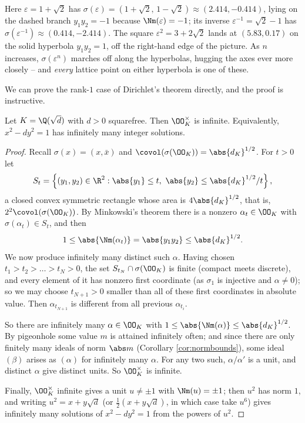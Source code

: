 Here $\varepsilon = 1+\sqrt2$ has $\sigma(\varepsilon) = (1+\sqrt2,\,1-\sqrt2)\approx(2.414,-0.414)$, lying on the dashed branch $y_1y_2 = -1$ because $\Nm(\varepsilon) = -1$; its inverse $\varepsilon^{-1} = \sqrt2-1$ has $\sigma(\varepsilon^{-1}) \approx (0.414,-2.414)$. The square $\varepsilon^2 = 3+2\sqrt2$ lands at $(5.83, 0.17)$ on the solid hyperbola $y_1y_2 = 1$, off the right-hand edge of the picture. As $n$ increases, $\sigma(\varepsilon^n)$ marches off along the hyperbolas, hugging the axes ever more closely -- and \emph{every} lattice point on either hyperbola is one of these.

We can prove the rank-$1$ case of Dirichlet's theorem directly, and the proof is instructive.

\begin{theorem}[Pell]\label{nf-thm:pell}
	Let $K = \Q(\sqrt d)$ with $d > 0$ squarefree. Then $\OO_K^\times$ is infinite. Equivalently, $x^2-dy^2 = 1$ has infinitely many integer solutions.
\end{theorem}

\begin{proof}
	Recall $\sigma(x) = (x,\bar x)$ and $\covol(\sigma(\OO_K)) = \abs{d_K}^{1/2}$. For $t > 0$ let
	$$S_t = \left\{(y_1,y_2) \in \R^2 : \abs{y_1}\le t,\ \abs{y_2}\le \abs{d_K}^{1/2}/t\right\},$$
	a closed convex symmetric rectangle whose area is $4\abs{d_K}^{1/2}$, that is, $2^2\covol(\sigma(\OO_K))$. By Minkowski's theorem there is a nonzero $\alpha_t \in \OO_K$ with $\sigma(\alpha_t)\in S_t$, and then
	$$1 \le \abs{\Nm(\alpha_t)} = \abs{y_1y_2} \le \abs{d_K}^{1/2}.$$
	We now produce infinitely many distinct such $\alpha$. Having chosen $t_1 > t_2 > \dots > t_N > 0$, the set $S_{t_N}\cap\sigma(\OO_K)$ is finite (compact meets discrete), and every element of it has nonzero first coordinate (as $\sigma_1$ is injective and $\alpha \neq 0$); so we may choose $t_{N+1} > 0$ smaller than all of these first coordinates in absolute value. Then $\alpha_{t_{N+1}}$ is different from all previous $\alpha_{t_i}$.

	So there are infinitely many $\alpha \in \OO_K$ with $1 \le \abs{\Nm(\alpha)}\le\abs{d_K}^{1/2}$. By pigeonhole some value $m$ is attained infinitely often; and since there are only finitely many ideals of norm $\abs m$ (Corollary \ref{cor:normbounds}), some ideal $(\beta)$ arises as $(\alpha)$ for infinitely many $\alpha$. For any two such, $\alpha/\alpha'$ is a unit, and distinct $\alpha$ give distinct units. So $\OO_K^\times$ is infinite.

	Finally, $\OO_K^\times$ infinite gives a unit $u \neq \pm1$ with $\Nm(u) = \pm1$; then $u^2$ has norm $1$, and writing $u^2 = x+y\sqrt d$ (or $\tfrac12(x+y\sqrt d)$, in which case take $u^6$) gives infinitely many solutions of $x^2-dy^2=1$ from the powers of $u^2$.
\end{proof}

